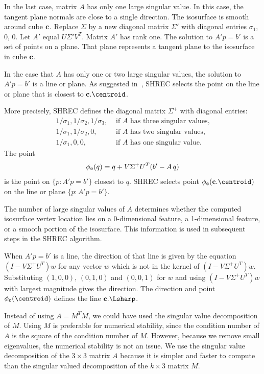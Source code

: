 In the last case,
matrix $A$ has only one large singular value.
In this case, the tangent plane normals are close to a single direction.
The isosurface is smooth around cube $\mathbf{c}$.
Replace $\Sigma$ by a new diagonal matrix $\Sigma'$
with diagonal entries $\sigma_1$, 0, 0.
Let $A'$ equal $U \Sigma' V^T$.
Matrix $A'$ has rank one.
The solution to $A' p = b'$ is a set of points on a plane.
That plane represents a tangent plane to the isosurface in cube $\mathbf{c}$.

In the case that $A$ has only one or two large singular values,
the solution to $A' p = b'$ is a line or plane.
As suggested in~\cite{sw-dcss-02},
SHREC selects the point on the line or plane that is closest 
to $\cb.\centroid$.

More precisely, SHREC defines the diagonal matrix $\Sigma^+$
with diagonal entries:
\begin{equation*}
\begin{array}{ll}
1/\sigma_1, 1/\sigma_2, 1/\sigma_3, 
  & \mbox{ if $A$ has three singular values,}\\
1/\sigma_1, 1/\sigma_2, 0, 
  & \mbox{ if $A$ has two singular values,}\\
1/\sigma_1, 0, 0, 
  & \mbox{ if $A$ has one singular value.}
\end{array}
\end{equation*}
The point
\begin{equation}
\label{eqn:Lindstrom}
\phi_{\mathbf{c}}(q) = q + V \Sigma^+ U^T (b' - A \, q) 
\end{equation}
is the point on $\{p: A' p = b'\}$ closest to $q$.
SHREC selects point $\phi_\cb(\cb.\centroid)$
on the line or plane $\{p: A'p = b'\}$.

The number of large singular values of $A$ determines
whether the computed isosurface vertex location lies 
on a 0-dimensional feature, a 1-dimensional feature, 
or a smooth portion of the isosurface.
This information is used in subsequent steps in the SHREC algorithm.

When $A' p = b'$ is a line,
the direction of that line is given by the equation $(I - V \Sigma^+ U^T ) w$
for any vector $w$ which is not in the kernel of $(I - V \Sigma^+ U^T ) w$.
Substituting $(1,0,0)$, $(0,1,0)$ and $(0,0,1)$ for $w$
and using $(I - V \Sigma^+ U^T ) w$ with largest magnitude
gives the direction.
The direction and point $\phi_\cb(\centroid)$ defines the line $\cb.\Lsharp$.

Instead of using $A = M^T M$,
we could have used the singular value decomposition of $M$.
Using $M$ is preferable for numerical stability,
since the condition number of $A$ is the square of the condition number of $M$.
However, because we remove small eigenvalues,
the numerical stability is not an issue.
We use the singular value decomposition of the $3 \times 3$ matrix $A$
because it is simpler and faster to compute 
than the singular valued decomposition of the $k \times 3$ matrix $M$.


